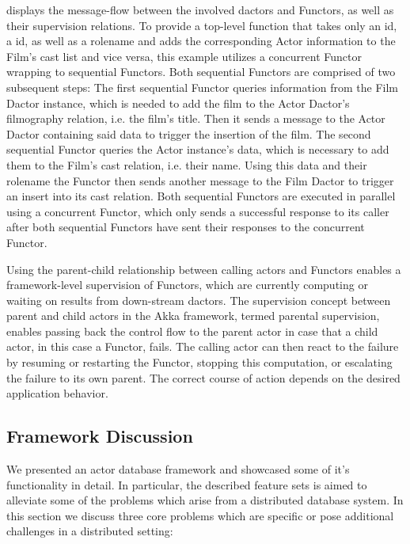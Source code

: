  displays the message-flow between the involved \glspl{dactor} and Functors, as well as their supervision relations.
To provide a top-level function that takes only an  id, a  id, as well as a rolename and adds the corresponding Actor information to the Film's cast list and vice versa, this example utilizes a concurrent Functor wrapping to sequential Functors.
Both sequential Functors are comprised of two subsequent steps:
The first sequential Functor queries information from the Film Dactor instance, which is needed to add the film to the Actor Dactor's filmography \gls{relation}, i.e. the film's title.
Then it sends a message to the Actor Dactor containing said data to trigger the insertion of the film.
The second sequential Functor queries the Actor instance's data, which is necessary to add them to the Film's cast \gls{relation}, i.e. their name. Using this data and their rolename the Functor then sends another message to the Film Dactor to trigger an insert into its cast \gls{relation}.
Both sequential Functors are executed in parallel using a concurrent Functor, which only sends a successful response to its caller after both sequential Functors have sent their responses to the concurrent Functor.

Using the parent-child relationship between calling actors and Functors enables a framework-level supervision of Functors, which are currently computing or waiting on results from down-stream \glspl{dactor}.
The supervision concept between parent and child actors in the Akka framework, termed parental supervision, enables passing back the control flow to the parent actor in case that a child actor, in this case a Functor, fails.
The calling actor can then react to the failure by resuming or restarting the Functor, stopping this computation, or escalating the failure to its own parent.
The correct course of action depends on the desired application behavior.

\subsection[Framework Discussion]{Framework Discussion}\label{subsec:framework_discussion}

We presented an actor database framework and showcased some of it's functionality in detail.
In particular, the described feature sets is aimed to alleviate some of the problems which arise from a distributed database system.
In this section we discuss three core problems which are specific or pose additional challenges in a distributed setting:

